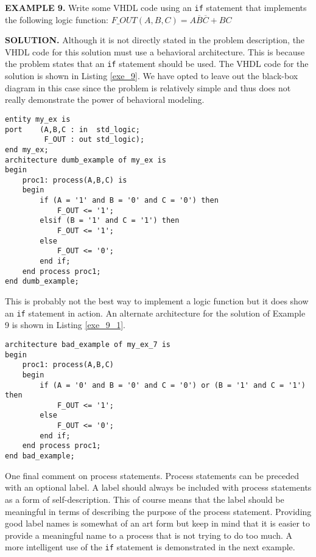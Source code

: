 \begin{leftbar}
\noindent
\textbf{EXAMPLE 9.}
Write some VHDL code  using an \texttt{if} statement that implements the following logic function: 
$F\_OUT(A,B,C)=A\overline{B}\overline{C}+BC$
\end{leftbar}
\noindent
\textbf{SOLUTION.} Although it is not directly stated in the problem description, the VHDL code for this solution must use a behavioral architecture. This is because the problem states that an \texttt{if} statement should be used. The VHDL code for the solution is shown in Listing \ref{exe_9}. We have opted to leave out the black-box diagram in this case since the problem is relatively simple and thus does not really demonstrate the power of behavioral modeling.
\begin{lstlisting}[label=exe_9, caption=Solution to Example 9.]
entity my_ex is
port 	(A,B,C : in  std_logic;
	 	 F_OUT : out std_logic);
end my_ex;
architecture dumb_example of my_ex is
begin
	proc1: process(A,B,C) is
	begin
		if (A = '1' and B = '0' and C = '0') then
	   		F_OUT <= '1';
		elsif (B = '1' and C = '1') then
	   		F_OUT <= '1';
		else
	   		F_OUT <= '0';
		end if;
	end process proc1;
end dumb_example;
\end{lstlisting}
This is probably not the best way to implement a logic function but it does show an \texttt{if} statement in action. An alternate architecture for the solution of Example 9 is shown in Listing \ref{exe_9_1}.
\begin{lstlisting}[label=exe_9_1, caption=Alternative solution to Example 9.]
architecture bad_example of my_ex_7 is
begin
	proc1: process(A,B,C)
	begin
		if (A = '0' and B = '0' and C = '0') or (B = '1' and C = '1') then
	   		F_OUT <= '1';
		else
	   		F_OUT <= '0';
		end if;
	end process proc1;
end bad_example;
\end{lstlisting}
One final comment on process statements. Process statements can be preceded with an optional label. A label should always be included with process statements as a form of self-description. This of course means that the label should be meaningful in terms of describing the purpose of the process statement. Providing good label names is somewhat of an art form but keep in mind that it is easier to provide a meaningful name to a process that is not trying to do too much. A more intelligent use of the \texttt{if} statement is demonstrated in the next example.

